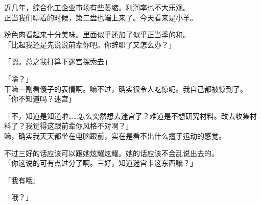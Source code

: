 近几年，综合化工企业市场有些萎缩。利润率也不大乐观。\\

正当我们聊着的时候，第二盘也端上来了。今天看来是小羊。

粉色肉看起来十分美味。里面似乎还加了似乎正当季的和。\\

「比起我还是先说说前辈你吧。你辞职了又怎么办？」

「嗯。总之我打算下迷宫探索去」

「啥？」\\

干嘛一副看傻子的表情啊。嘛不过，确实很令人吃惊呢。我自己都被惊到了。\\

「你不知道吗？迷宫」

「不，知道是知道啦……怎么突然想去迷宫了？难道是不想研究材料。改去收集材料了？我觉得这跟前辈你风格不对啊？」\\

嘛，确实我天天都坐在电脑跟前，实在是看不出什么擅于运动的感觉。

不过三好的话应该可以跟她炫耀炫耀。她的话应该不会乱说出去的。\\

「你这说的可有点过分了啊。三好，知道迷宫卡这东西嘛？」

「我有哦」

「哦？」

